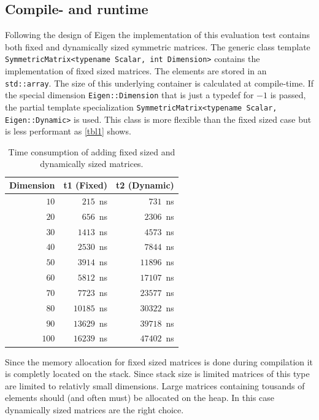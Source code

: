 \documentclass[a4wide]{scrartcl}
\begin{document}
\subsection{Compile- and runtime}
Following the design of Eigen the implementation of this evaluation test contains both fixed and dynamically sized symmetric matrices. The generic class template \texttt{SymmetricMatrix<typename Scalar, int Dimension>} contains the implementation of fixed sized matrices. The elements are stored in an \texttt{std::array}. The size of this underlying container is calculated at compile-time. \newline
If the special dimension \texttt{Eigen::Dimension} that is just a typedef for $-1$ is passed, the partial template specialization \texttt{SymmetricMatrix<typename Scalar, Eigen::Dynamic>} is used. This class is more flexible than the fixed sized case but is less performant as \autoref{tbl1} shows.\newline\newline
\begin{table}
\centering
\begin{tabular}{r|r|r}
Dimension & t1 (Fixed)  & t2 (Dynamic)  \\ \hline \hline
$10$  & $215$~ns & $731$~ns \\
$20$  & $656$~ns & $2306$~ns \\
$30$  & $1413$~ns & $4573$~ns \\
$40$  & $2530$~ns & $7844$~ns \\
$50$  & $3914$~ns & $11896$~ns \\
$60$  & $5812$~ns & $17107$~ns \\
$70$  & $7723$~ns & $23577$~ns \\
$80$  & $10185$~ns & $30322$~ns \\
$90$  & $13629$~ns & $39718$~ns \\
$100$ & $16239$~ns & $47402$~ns
\end{tabular}
\caption{Time consumption of adding fixed sized and dynamically sized matrices.}
\label{tbl1}
\end{table}
Since the memory allocation for fixed sized matrices is done during compilation it is completly located on the stack. Since stack size is limited matrices of this type are limited to relativly small dimensions. Large matrices containing tousands of elements should (and often must) be allocated on the heap. In this case dynamically sized matrices are the right choice.
\end{document}
